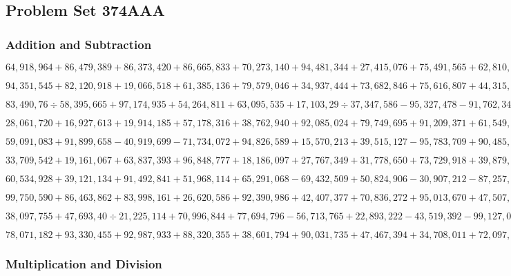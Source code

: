 \hypertarget{problem-set-374aaa}{%
\subsection{Problem Set 374AAA}\label{problem-set-374aaa}}

\hypertarget{addition-and-subtraction}{%
\subsubsection{Addition and
Subtraction}\label{addition-and-subtraction}}

\(64,918,964+86,479,389+86,373,420+86,665,833+70,273,140+94,481,344+27,415,076+75,491,565+62,810,506+63,651,331\)

\(94,351,545+82,120,918+19,066,518+61,385,136+79,579,046+34,937,444+73,682,846+75,616,807+44,315,983+94,714,982\)

\(83,490,76÷58,395,665+97,174,935+54,264,811+63,095,535+17,103,29÷37,347,586-95,327,478-91,762,340+72,704,286\)

\(28,061,720+16,927,613+19,914,185+57,178,316+38,762,940+92,085,024+79,749,695+91,209,371+61,549,764+33,468,697\)

\(59,091,083+91,899,658-40,919,699-71,734,072+94,826,589+15,570,213+39,515,127-95,783,709+90,485,22÷71,702,855\)

\(33,709,542+19,161,067+63,837,393+96,848,777+18,186,097+27,767,349+31,778,650+73,729,918+39,879,565+54,905,197\)

\(60,534,928+39,121,134+91,492,841+51,968,114+65,291,068-69,432,509+50,824,906-30,907,212-87,257,068-23,785,840\)

\(99,750,590+86,463,862+83,998,161+26,620,586+92,390,986+42,407,377+70,836,272+95,013,670+47,507,612+87,632,123\)

\(38,097,755+47,693,40÷21,225,114+70,996,844+77,694,796-56,713,765+22,893,222-43,519,392-99,127,053+43,562,978\)

\(78,071,182+93,330,455+92,987,933+88,320,355+38,601,794+90,031,735+47,467,394+34,708,011+72,097,423+94,518,714\)

\hypertarget{multiplication-and-division}{%
\subsubsection{Multiplication and
Division}\label{multiplication-and-division}}

